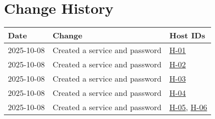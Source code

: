 \section{Change History}
\renewcommand{\arraystretch}{1.2}
\small
\begin{tabular}{|p{2.1cm}|p{7.5cm}|p{2.0cm}|}
\hline
\textbf{Date} & \textbf{Change} & \textbf{Host IDs} \\
\hline
2025-10-08 & Created a service and password  & \hyperlink{H-01}{H-01} \\
\hline
2025-10-08 & Created a service and password & \hyperlink{H-02}{H-02} \\
\hline
2025-10-08 & Created a service and password & \hyperlink{H-03}{H-03} \\
\hline
2025-10-08 & Created a service and password & \hyperlink{H-04}{H-04} \\
\hline
2025-10-08 & Created a service and password & \hyperlink{H-05}{H-05}, \hyperlink{H-06}{H-06} \\
\hline
\end{tabular}
